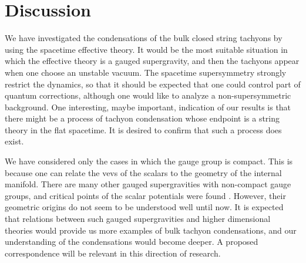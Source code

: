 \documentclass[a4paper,a4paper]{article}
\begin{document}
\vspace{1cm}

\section{Discussion} \label{discussion}

\vspace{5mm}

We have investigated the condensations of the bulk closed string tachyons by using the spacetime effective 
theory. 
It would be the most suitable situation in which the effective theory is a gauged supergravity, and then the 
tachyons appear when one choose an unstable vacuum. 
The spacetime supersymmetry strongly restrict the dynamics, so that it should be expected that one could control 
part of quantum corrections, although one would like to analyze a non-supersymmetric background. 
One interesting, maybe important, indication of our results is that there might be a process of tachyon 
condensation whose endpoint is a string theory in the flat spacetime. 
It is desired to confirm that such a process does exist. 

\vspace{3mm}

We have considered only the cases in which the gauge group is compact. 
This is because one can relate the vevs of the scalars to the geometry of the internal manifold. 
There are many other gauged supergravities with non-compact gauge groups, and critical points of the scalar 
potentials were found \cite{explicitP}\cite{5dim1}. 
However, their geometric origins do not seem to be understood well until now. 
It is expected that relations between such gauged supergravities and higher dimensional theories would provide us 
more examples of bulk tachyon condensations, and our understanding of the condensations would become deeper. 
A proposed correspondence \cite{DW/QFT} will be relevant in this direction of research. 

\vspace{3mm}
\end{document}
